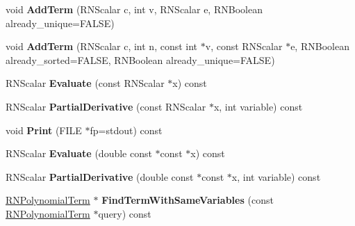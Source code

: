 \begin{DoxyCompactItemize}
\item 
void {\bfseries Add\+Term} (R\+N\+Scalar c, int v, R\+N\+Scalar e, R\+N\+Boolean already\+\_\+unique=F\+A\+L\+SE)\hypertarget{class_r_n_polynomial_a0d4f0f26175fb779e26c18e3374f5466}{}\label{class_r_n_polynomial_a0d4f0f26175fb779e26c18e3374f5466}

\item 
void {\bfseries Add\+Term} (R\+N\+Scalar c, int n, const int $\ast$v, const R\+N\+Scalar $\ast$e, R\+N\+Boolean already\+\_\+sorted=F\+A\+L\+SE, R\+N\+Boolean already\+\_\+unique=F\+A\+L\+SE)\hypertarget{class_r_n_polynomial_a43d7b61dcd6bef041e99d4ad080e03b9}{}\label{class_r_n_polynomial_a43d7b61dcd6bef041e99d4ad080e03b9}

\item 
R\+N\+Scalar {\bfseries Evaluate} (const R\+N\+Scalar $\ast$x) const \hypertarget{class_r_n_polynomial_a57ddc92b8d2c1be2b25b5d9c25e09b37}{}\label{class_r_n_polynomial_a57ddc92b8d2c1be2b25b5d9c25e09b37}

\item 
R\+N\+Scalar {\bfseries Partial\+Derivative} (const R\+N\+Scalar $\ast$x, int variable) const \hypertarget{class_r_n_polynomial_a460d18be132710363595506abb4ef447}{}\label{class_r_n_polynomial_a460d18be132710363595506abb4ef447}

\item 
void {\bfseries Print} (F\+I\+LE $\ast$fp=stdout) const \hypertarget{class_r_n_polynomial_a6f3113ec39e17db04ca0937c53391caa}{}\label{class_r_n_polynomial_a6f3113ec39e17db04ca0937c53391caa}

\item 
R\+N\+Scalar {\bfseries Evaluate} (double const $\ast$const $\ast$x) const \hypertarget{class_r_n_polynomial_a345420217ca04ae32675c0aefbf13c44}{}\label{class_r_n_polynomial_a345420217ca04ae32675c0aefbf13c44}

\item 
R\+N\+Scalar {\bfseries Partial\+Derivative} (double const $\ast$const $\ast$x, int variable) const \hypertarget{class_r_n_polynomial_aa19502bd1d0d97ed529fd9b701536c15}{}\label{class_r_n_polynomial_aa19502bd1d0d97ed529fd9b701536c15}

\item 
\hyperlink{class_r_n_polynomial_term}{R\+N\+Polynomial\+Term} $\ast$ {\bfseries Find\+Term\+With\+Same\+Variables} (const \hyperlink{class_r_n_polynomial_term}{R\+N\+Polynomial\+Term} $\ast$query) const \hypertarget{class_r_n_polynomial_a6caaa07dfe2b4174d4b0860ad0897215}{}\label{class_r_n_polynomial_a6caaa07dfe2b4174d4b0860ad0897215}


\end{DoxyCompactItemize}
